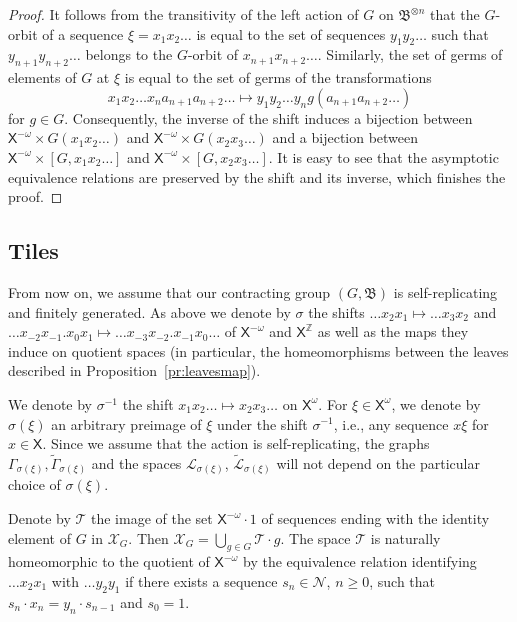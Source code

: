 \documentclass[11pt]{amsart}
\newcommand{\Z}{\ensuremath{\mathbb{Z}}}%
\newcommand{\bim}{\mathfrak{B}}
\newcommand{\limg}[1][G]{\mathcal{X}_{#1}}
\newcommand{\til}{\mathcal{T}}
\newcommand{\xo}{\alb^\omega}
\newcommand{\leaf}{\mathcal{L}}
\newcommand{\leaftilde}{\widetilde{\leaf}}
\newcommand{\xmo}{\alb^{-\omega}}
\newcommand{\alb}{\ensuremath{\mathsf{X}}}%
\newcommand{\nuke}{\ensuremath{\mathcal{N}}}%
\newcommand{\Gammatilde}{\ensuremath{\widetilde{\Gamma}}}%
\theoremstyle{definition}
\theoremstyle{plain}
\newtheorem{main thm}{Theorem}
\theoremstyle{remark}
\theoremstyle{plain}
\begin{document}
\begin{proof}
It follows from the transitivity of the left action of $G$ on $\bim^{\otimes n}$ that the $G$-orbit of a sequence $\xi=x_1x_2\ldots$ is equal to the set of sequences $y_1y_2\ldots$ such that $y_{n+1}y_{n+2}\ldots$ belongs to the $G$-orbit of $x_{n+1}x_{n+2}\ldots$. Similarly, the set of germs of elements of $G$ at $\xi$ is equal to the set of germs of the transformations
\[x_1x_2\ldots x_na_{n+1}a_{n+2}\ldots\mapsto y_1y_2\ldots y_n g(a_{n+1}a_{n+2}\ldots)\]
for $g\in G$. Consequently, the inverse of the shift induces a bijection between $\xmo\times G(x_1x_2\ldots)$ and $\xmo\times G(x_2x_3\ldots)$ and a bijection between $\xmo\times [G, x_1x_2\ldots]$ and $\xmo\times [G, x_2x_3\ldots]$. It is easy to see that the asymptotic equivalence relations are preserved by the shift and its inverse, which finishes the proof.\qedhere\end{proof}

\subsection{Tiles}

From now on, we assume that our contracting group $(G, \bim)$ is self-replicating and finitely generated. As above we denote by $\sigma$ the 
shifts $\ldots x_2x_1\mapsto \ldots x_3x_2$ and $\ldots x_{-2}x_{-1}.x_0x_1\mapsto \ldots x_{-3}x_{-2}.x_{-1}x_0\ldots$ of $\xmo$ and $\alb^{\Z}$ as well as the maps they induce on quotient spaces (in particular, the homeomorphisms between the leaves described in Proposition~\ref{pr:leavesmap}).

We denote by $\sigma^{-1}$ the shift $x_1x_2\ldots\mapsto x_2x_3\ldots$ on $\xo$. For $\xi\in\xo$, we denote by $\sigma(\xi)$ an arbitrary preimage of $\xi$ under the shift $\sigma^{-1}$, i.e., any sequence $x\xi$ for $x\in\alb$. Since we assume that the action is self-replicating, the graphs $\Gamma_{\sigma(\xi)}, \Gammatilde_{\sigma(\xi)}$ and the spaces $\leaf_{\sigma(\xi)}$, $\leaftilde_{\sigma(\xi)}$ will not depend on the particular choice of $\sigma(\xi)$.

Denote by $\til$ the image of the set $\alb^{-\omega}\cdot 1$ of sequences ending with the identity element of $G$ in $\limg$. Then $\limg=\bigcup_{g\in G}\til\cdot g$. The space $\til$ is naturally homeomorphic to the quotient of $\xmo$ by the equivalence relation identifying $\ldots x_2x_1$ with $\ldots y_2y_1$ if there exists a sequence $s_n\in\nuke$, $n\ge 0$, such that $s_n\cdot x_n=y_n\cdot s_{n-1}$ and $s_0=1$.
\end{document}

